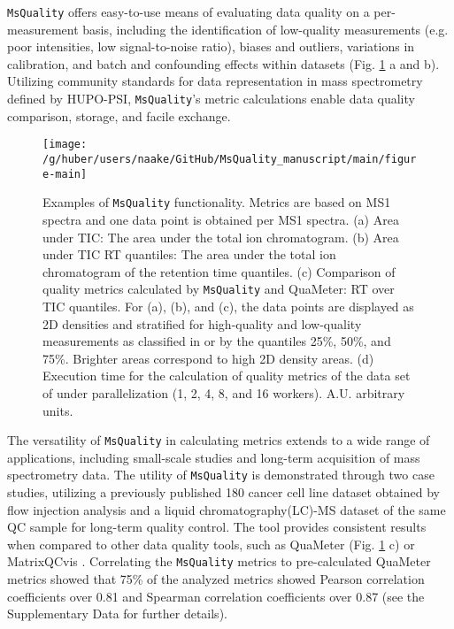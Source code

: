 \documentclass{bioinfo}
\begin{document}
\texttt{MsQuality} offers easy-to-use means of evaluating data quality on a 
per-measurement basis, including the identification of low-quality measurements 
(e.g. poor intensities, low signal-to-noise ratio), biases and outliers, 
variations in calibration, and batch and confounding effects within datasets
(Fig. \ref{fig:fig1} a and b). 
Utilizing community standards for data representation in mass spectrometry 
defined by HUPO-PSI, \texttt{MsQuality}'s metric calculations enable 
data quality comparison, storage, and facile exchange.

\begin{figure}[ht!]
    \centering
 	\texttt{[image: /g/huber/users/naake/GitHub/MsQuality\_manuscript/main/figure-main]}
 	  \caption{Examples of \texttt{MsQuality} functionality. Metrics are based
 	        on MS1 spectra and one data point is obtained per MS1 spectra.
 	        (a) Area under TIC: The area under the total ion chromatogram. 
            (b) Area under TIC RT quantiles: The area under the total ion
                chromatogram of the retention time quantiles. 
            (c) Comparison of quality metrics calculated by \texttt{MsQuality} 
                and QuaMeter: RT over TIC quantiles. 
            For (a), (b), and (c), the data points are displayed 
                as 2D densities and stratified for high-quality and low-quality
                measurements as classified in \cite{Amidan2014} or by the
                quantiles 25\%, 50\%, and 75\%. Brighter areas correspond to 
                high 2D density areas.
            (d) Execution time for the calculation of quality metrics of the 
                data set of \cite{Amidan2014} under parallelization 
                (1, 2, 4, 8, and 16 workers). A.U. arbitrary units.
    } \label{fig:fig1}
\end{figure}

The versatility of \texttt{MsQuality} in calculating metrics extends to a 
wide range of applications, including small-scale studies and long-term 
acquisition of mass spectrometry data. 
The utility of \texttt{MsQuality} is demonstrated through two case studies, 
utilizing a previously published 180 cancer cell line dataset obtained by 
flow injection analysis \citep{Cherkaoui2022} and a liquid 
chromatography(LC)-MS dataset of
the same QC sample \citep{Amidan2014} for long-term quality control.
The tool provides consistent results 
when compared to other data quality tools, such as QuaMeter \citep{Ma2012} 
(Fig. \ref{fig:fig1} c) or MatrixQCvis \citep{Naake2022}. Correlating the 
\texttt{MsQuality} metrics to pre-calculated QuaMeter metrics 
\citep{Amidan2014} showed that 75\% of the analyzed metrics showed Pearson
correlation coefficients over 0.81 and Spearman correlation coefficients over 
0.87 (see the Supplementary Data for further details).
\end{document}

